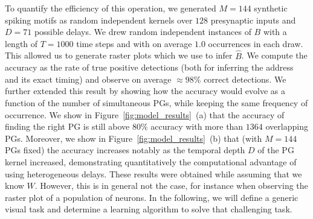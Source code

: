\documentclass[default]{sn-jnl}%
\theoremstyle{thmstyleone}%
\theoremstyle{thmstyletwo}%
\theoremstyle{thmstylethree}%
\begin{document}
To quantify the efficiency of this operation, we generated $M=144$ synthetic spiking motifs as random independent kernels over $128$ presynaptic inputs and $D=71$ possible delays. We drew random independent instances of $B$ with a length of $T=1000$ time steps and with on average $1.0$ occurrences in each draw. This allowed us to generate raster plots which we use to infer $\hat{B}$. We compute the accuracy as the rate of true positive detections (both for inferring the address and its exact timing) and observe on average $\approx 98\%$ correct detections. We further extended this result by showing how the accuracy would evolve as a function of the number of simultaneous PGs, while keeping the same frequency of occurrence. We show in Figure~\ref{fig:model_results}~(a) that the accuracy of finding the right PG is still above $80\%$ accuracy with more than $1364$ overlapping PGs. Moreover, we show in Figure~\ref{fig:model_results}~(b) that (with $M=144$ PGs fixed) the accuracy increases notably as the temporal depth $D$ of the PG kernel increased, demonstrating quantitatively the computational advantage of using heterogeneous delays. These results were obtained while assuming that we know $W$. However, this is in general not the case, for instance when observing the raster plot of a population of neurons. In the following, we will define a generic visual task and determine a learning algorithm to solve that challenging task. %
    
\end{document}
